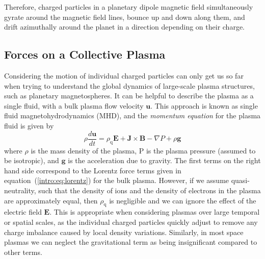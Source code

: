 Therefore, charged particles in a planetary dipole magnetic field simultaneously gyrate around the magnetic field lines, bounce up and down along them, and drift azimuthally around the planet in a direction depending on their charge.

\subsection{Forces on a Collective Plasma}\label{intro:sec:plasmaforces}
Considering the motion of individual charged particles can only get us so far when trying to understand the global dynamics of large-scale plasma structures, such as planetary magnetospheres. It can be helpful to describe the plasma as a single fluid, with a bulk plasma flow velocity $\boldsymbol{u}$. This approach is known as single fluid magnetohydrodynamics (MHD), and the \textit{momentum equation} for the plasma fluid is given by
\begin{equation}\label{intro:eq:momentum}
\rho\frac{d\boldsymbol{u}}{dt} = \rho_\mathrm{q}\boldsymbol{E} + \boldsymbol{J}\times\boldsymbol{B} - \nabla P + \rho \boldsymbol{g}
\end{equation}
where $\rho$ is the mass density of the plasma, P is the plasma pressure (assumed to be isotropic), and $\boldsymbol{g}$ is the acceleration due to gravity. The first terms on the right hand side correspond to the Lorentz force terms given in equation~(\ref{intro:eq:lorentz}) for the bulk plasma. However, if we assume quasi-neutrality, such that the density of ions and the density of electrons in the plasma are approximately equal, then $\rho_\mathrm{q}$ is negligible and we can ignore the effect of the electric field $\boldsymbol{E}$. This is appropriate when considering plasmas over large temporal or spatial scales, as the individual charged particles quickly adjust to remove any charge imbalance caused by local density variations. Similarly, in most space plasmas we can neglect the gravitational term as being insignificant compared to other terms.

